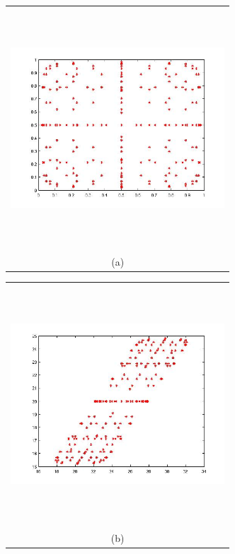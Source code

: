\documentclass{article}
\newcommand{\Pic}[2][0.85]{\begin{center}\texttt{[image: \#2]}
 \end{center} }
\begin{document}
\begin{figure}[H]
      \begin{minipage}[b]{0.6\textwidth}
        \begin{tabular}{c}
       \includegraphics[width=8cm,height=9cm,keepaspectratio]{fig/GQU_a_210.jpg}\\
        (a)
        \end{tabular}
    \end{minipage}
    \begin{minipage}{0.6\textwidth}
        \begin{tabular}{c}
	\includegraphics[width=8cm,height=9cm,keepaspectratio]{fig/GQU_b_201.jpg}\\
        (b)
        \end{tabular}

\end{minipage}
\end{figure}
\end{document}

